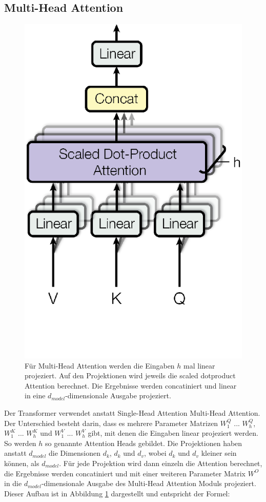 \documentclass[conference]{IEEEtran}
\begin{document}
\subsection{Multi-Head Attention}
\begin{figure}[htbp]
\centerline{\includegraphics{img/multi_head_attention.png}}
\caption{Für Multi-Head Attention werden die Eingaben $h$ mal linear projeziert. Auf den Projektionen wird jeweils die scaled dotproduct Attention berechnet. Die Ergebnisse werden concatiniert und linear in eine $d_{model}$-dimensionale Ausgabe projeziert. \cite{attention_is_all_you_need}}
\label{fig:3}
\end{figure}
Der Transformer verwendet anstatt Single-Head Attention Multi-Head Attention. Der Unterschied besteht darin, dass es mehrere Parameter Matrizen $W_1^Q$ ... $W_h^Q$, $W_1^K$ ... $W_h^K$ und $W_1^V$ ... $W_h^V$ gibt, mit denen die Eingaben linear projeziert werden. So werden $h$ so genannte Attention Heads gebildet. Die Projektionen haben anstatt $d_{model}$ die Dimensionen $d_k$, $d_k$ und $d_v$, wobei $d_k$ und $d_v$ kleiner sein können, als $d_{model}$. Für jede Projektion wird dann einzeln die Attention berechnet, die Ergebnisse werden concatiniert und mit einer weiteren Parameter Matrix $W^O$ in die $d_{model}$-dimensionale Ausgabe des Multi-Head Attention Moduls projeziert. Dieser Aufbau ist in Abbildung \ref{fig:3} dargestellt und entspricht der Formel:
\end{document}
